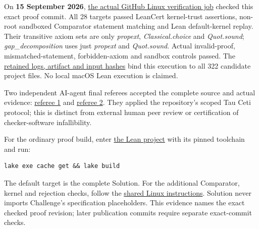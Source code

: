 \documentclass[11pt,a4paper]{article}
\makeatletter
\renewcommand{\subsection}{\Needspace{4\baselineskip}\@startsection{subsection}{2}{0pt}{9pt plus 1pt minus 1pt}{3pt}{\sffamily\bfseries\normalsize\color{ink}}}
\makeatother
\begin{document}
On \textbf{15 September 2026},
\href{https://github.com/sgstepaniants/OpenProblemsInNLA/actions/runs/35037011332/job/104608341268}{the
actual GitHub Linux verification job} checked this exact proof commit.
All 28 targets passed LeanCert kernel-trust assertions, non-root
sandboxed Comparator statement matching and Lean default-kernel replay.
Their transitive axiom sets are only \textit{propext},
\textit{Classical.choice} and \textit{Quot.sound};
\textit{gap\_decomposition} uses just \textit{propext} and
\textit{Quot.sound}. Actual invalid-proof, mismatched-statement,
forbidden-axiom and sandbox controls passed. The
\href{https://github.com/ajt60gaibb/OpenProblemsInNLA/blob/main/matrix-functions-and-stability/MF-12/lean/verification/linux-2026-09-15}{retained
logs, artifact and input hashes} bind this execution to all 322
candidate project files. No local macOS Lean execution is claimed.

Two independent AI-agent final referees accepted the complete source and
actual evidence:
\href{https://github.com/ajt60gaibb/OpenProblemsInNLA/blob/main/matrix-functions-and-stability/MF-12/lean/reviews/final/referee-elimination/REVIEW.md}{referee
1} and
\href{https://github.com/ajt60gaibb/OpenProblemsInNLA/blob/main/matrix-functions-and-stability/MF-12/lean/reviews/final/referee-inequalities/REVIEW.md}{referee
2}. They applied the repository's scoped Tau Ceti protocol; this is
distinct from external human peer review or certification of
checker-software infallibility.

For the ordinary proof build, enter
\href{https://github.com/ajt60gaibb/OpenProblemsInNLA/blob/main/matrix-functions-and-stability/MF-12/lean/README.md}{the
Lean project} with its pinned toolchain and run:

\begin{verbatim}
lake exe cache get && lake build
\end{verbatim}

The default target is the complete Solution. For the additional
Comparator, kernel and rejection checks, follow the
\href{https://github.com/ajt60gaibb/OpenProblemsInNLA/blob/main/docs/lean/README.md}{shared
Linux instructions}. Solution never imports Challenge's specification
placeholders. This evidence names the exact checked proof revision;
later publication commits require separate exact-commit checks.

\newpage

\subsection{Context and notation}\label{context-and-notation}
\end{document}
